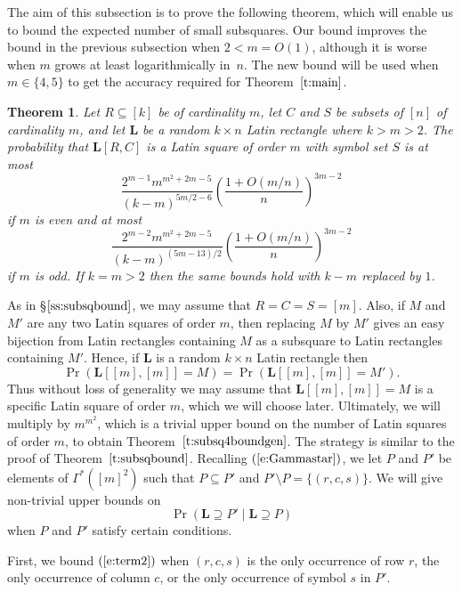 \documentclass[12pt]{article}
\newtheorem{thm}{Theorem}[section]
\theoremstyle{definition}
\numberwithin{equation}{section}
\def\eref#1{$(\ref{#1})$}
\def\sref#1{\S$\ref{#1}$}
\def\tref#1{Theorem~$\ref{#1}$}
\renewcommand{\L}{\mathbf{L}}
\begin{document}
	The aim of this subsection is to prove the following theorem,
	which will enable us to bound the expected number of small
	subsquares. Our bound improves the bound in the previous
	subsection when $2<m=O(1)$, although it is worse when $m$ grows
	at least logarithmically in~$n$. The new bound will be used
	when $m\in\{4,5\}$ to get the accuracy required for \tref{t:main}.
	
	\begin{thm}\label{t:subsq4boundgen}
		Let $R \subseteq [k]$ be of cardinality $m$, let $C$ and $S$ be
		subsets of $[n]$ of cardinality $m$, and let $\L$ be a random
		$k\times n$ Latin rectangle where $k>m>2$.
		The probability that $\L[R, C]$ is a Latin
		square of order $m$ with symbol set $S$ is at most
		\[
		\frac{2^{m-1}m^{m^2+2m-5}}{(k-m)^{5m/2-6}}\left(\frac{1+O(m/n)}n\right)^{3m-2}
		\]
		if $m$ is even and at most
		\[
		\frac{2^{m-2}m^{m^2+2m-5}}{(k-m)^{(5m-13)/2}}\left(\frac{1+O(m/n)}n\right)^{3m-2}
		\]
		if $m$ is odd. If $k=m>2$ then the same bounds hold with $k-m$ replaced by $1$.
	\end{thm}
	
	As in \sref{ss:subsqbound}, we may assume that $R=C=S=[m]$. 
	Also, if $M$ and $M'$ are any two Latin squares of order $m$, then
	replacing $M$ by $M'$ gives an easy bijection from Latin rectangles
	containing $M$ as a subsquare to Latin rectangles containing $M'$. Hence,
	if $\L$ is a random $k \times n$ Latin rectangle then
	\begin{equation}\label{e:swapM}
		\Pr(\L[[m], [m]] = M) = \Pr(\L[[m], [m]] = M').
	\end{equation}
	Thus without loss of
	generality we may assume that $\L[[m],[m]]=M$ is a specific Latin square
	of order $m$, which we will choose later. Ultimately, we will multiply
	by $m^{m^2}$, which is a trivial upper bound on the number of Latin
	squares of order $m$, to obtain \tref{t:subsq4boundgen}.	
	The strategy is similar to the proof of \tref{t:subsqbound}.
	Recalling \eref{e:Gammastar}, we let
	$P$ and $P'$ be elements of $\Gamma^*([m]^2)$ such that $P \subseteq
	P'$ and $P'\setminus P=\{(r, c, s)\}$. We will give non-trivial upper
	bounds on
	\begin{equation}\label{e:term2}
		\Pr(\L \supseteq P' \mid  \L \supseteq P)	
	\end{equation}
	when $P$ and $P'$ satisfy certain conditions. 
	
	First, we bound \eref{e:term2} when $(r, c, s)$ is the only occurrence
	of row $r$, the only occurrence of column $c$, or the only occurrence
	of symbol $s$ in $P'$.
	
\end{document}
